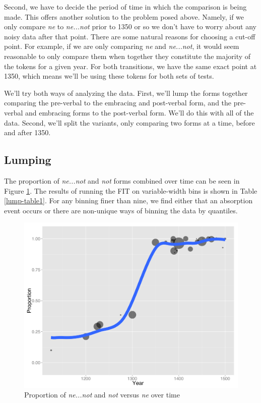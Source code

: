 Second, we have to decide the period of time in which the comparison is being made. This offers another solution to the problem posed above. Namely, if we only compare \textit{\color{red} ne} to \textit{\color{blue} ne...not} prior to 1350 or so we don't have to worry about any noisy  data after that point. There are some natural reasons for choosing a cut-off point. For example, if we are only comparing \textit{\color{red} ne} and \textit{\color{blue} ne...not}, it would seem reasonable to only compare them  when together they constitute the majority of the tokens for a given year. For both transitions, we have the same exact point at 1350, which means we'll be using these tokens for both sets of tests.

We'll try both ways of analyzing the data. First, we'll lump the forms together comparing the pre-verbal to the embracing and post-verbal form, and the pre-verbal and embracing forms to the post-verbal form. We'll do this with all of the data. Second, we'll split the variants, only comparing two forms at a time, before and after 1350.

\subsection{Lumping}

The proportion of \textit{\color{blue} ne...not} and \textit{\color{green} not} forms combined over time can be seen in Figure \ref{lump-plot1}. The results of running the FIT on variable-width bins is shown in Table \ref{lump-table1}. For any binning finer than nine, we find either that an absorption event occurs or there are non-unique ways of binning the data by quantiles.


\begin{figure}
\centering
     \includegraphics[width=\textwidth]{lump-plot1.pdf}
\caption{Proportion of \textit{\color{blue} ne...not} and \textit{\color{green} not}  versus  \textit{\color{red}  ne} over time}
\label{lump-plot1}
\end{figure}


